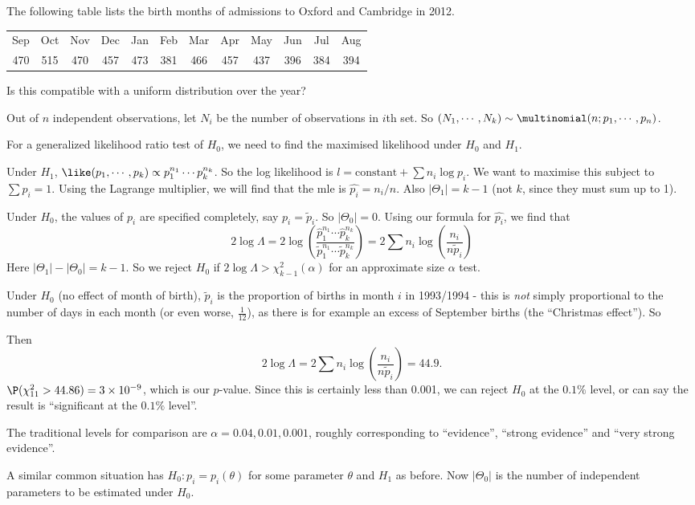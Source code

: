 \documentclass[a4paper]{article}
\begin{document}
\begin{eg}
  The following table lists the birth months of admissions to Oxford and Cambridge in 2012.
  \begin{center}
    \begin{tabular}{cccccccccccc}
      \toprule
      Sep & Oct & Nov & Dec & Jan & Feb & Mar & Apr & May & Jun & Jul & Aug\\
      470 & 515 & 470 & 457 & 473 & 381 & 466 & 457 & 437 & 396 & 384 & 394\\
      \bottomrule
    \end{tabular}
  \end{center}
  Is this compatible with a uniform distribution over the year?

  Out of $n$ independent observations, let $N_i$ be the number of observations in $i$th set. So $(N_1,\cdots, N_k)\sim \multinomial(n; p_1, \cdots, p_n)$.

  For a generalized likelihood ratio test of $H_0$, we need to find the maximised likelihood under $H_0$ and $H_1$.

  Under $H_1$, $\like(p_1, \cdots, p_k) \propto p_1^{n_1}\cdots p_k^{n_k}$. So the log likelihood is $l = \text{constant} + \sum n_i \log p_i$. We want to maximise this subject to $\sum p_i = 1$. Using the Lagrange multiplier, we will find that the mle is $\hat{p_i} = n_i/n$. Also $|\Theta_1| = k - 1$ (not $k$, since they must sum up to 1).

  Under $H_0$, the values of $p_i$ are specified completely, say $p_i = \tilde{p}_i$. So $|\Theta_0| = 0$. Using our formula for $\hat{p_i}$, we find that
  \[
    2\log \Lambda = 2\log\left(\frac{\hat{p}_1^{n_1}\cdots \hat{p}_k^{n_k}}{\tilde{p}_{1}^{n_1}\cdots \tilde{p}_k^{n_k}}\right) = 2\sum n_i \log \left(\frac{n_i}{n\tilde{p}_i}\right)\tag{1}
  \]
  Here $|\Theta_1| - |\Theta_0| = k - 1$. So we reject $H_0$ if $2\log \Lambda > \chi_{k - 1}^2(\alpha)$ for an approximate size $\alpha$ test.

  Under $H_0$ (no effect of month of birth), $\tilde{p}_i$ is the proportion of births in month $i$ in 1993/1994 - this is \emph{not} simply proportional to the number of days in each month (or even worse, $\frac{1}{12}$), as there is for example an excess of September births (the ``Christmas effect''). So

  Then
  \[
    2\log \Lambda = 2\sum n_i \log\left(\frac{n_i}{n\tilde{p}_i}\right) = 44.9.
  \]
  $\P(\chi_{11}^2 > 44.86) = 3\times 10^{-9}$, which is our $p$-value. Since this is certainly less than 0.001, we can reject $H_0$ at the $0.1\%$ level, or can say the result is ``significant at the $0.1\%$ level''.

  The traditional levels for comparison are $\alpha = 0.04, 0.01, 0.001$, roughly corresponding to ``evidence'', ``strong evidence'' and ``very strong evidence''.
\end{eg}
A similar common situation has $H_0: p_i = p_i(\theta)$ for some parameter $\theta$ and $H_1$ as before. Now $|\Theta_0|$ is the number of independent parameters to be estimated under $H_0$.
\end{document}
